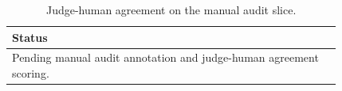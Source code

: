 \begin{table}[t]
\centering
\caption{Judge-human agreement on the manual audit slice.}
\label{tab:audit-agreement}
\begin{tabular}{p{0.82\linewidth}}
\hline
Status \\
\hline
Pending manual audit annotation and judge-human agreement scoring. \\
\hline
\end{tabular}
\end{table}

